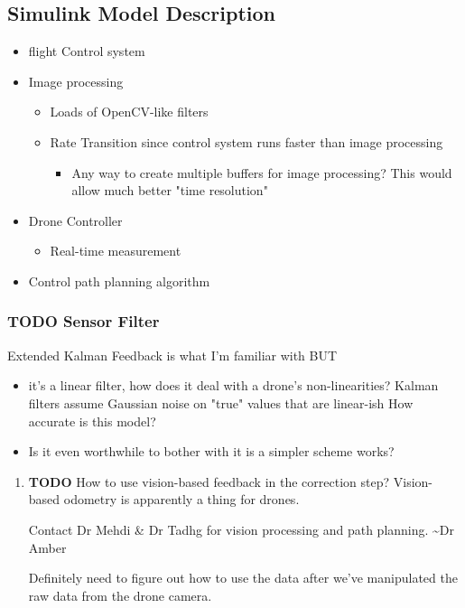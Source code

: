 \documentclass[11pt]{article}
\begin{document}
\subsection{Simulink Model Description}
\label{sec:orgbdc0dc7}

\begin{itemize}
\item flight Control system
\item Image processing
\begin{itemize}
\item Loads of OpenCV-like filters
\item Rate Transition since control system runs faster than image processing
\begin{itemize}
\item Any way to create multiple buffers for image processing?
This would allow much better "time resolution"
\end{itemize}
\end{itemize}
\item Drone Controller
\begin{itemize}
\item Real-time measurement
\end{itemize}
\item Control path planning algorithm
\end{itemize}

\subsubsection{{\bfseries\sffamily TODO} Sensor Filter}
\label{sec:org7e95304}
Extended Kalman Feedback is what I'm familiar with BUT
\begin{itemize}
\item it's a linear filter, how does it deal with a drone's non-linearities?
Kalman filters assume Gaussian noise on "true" values that are linear-ish
How accurate is this model?
\item Is it even worthwhile to bother with it is a simpler scheme works?
\end{itemize}
\begin{enumerate}
\item {\bfseries\sffamily TODO} How to use vision-based feedback in the correction step?
\label{sec:org2d0a8bf}
Vision-based odometry is apparently a thing for drones.

Contact Dr Mehdi \& Dr Tadhg for vision processing and path planning. \textasciitilde{}Dr Amber

Definitely need to figure out how to use the data after we've manipulated the raw data from the drone camera.
\end{enumerate}
\end{document}
